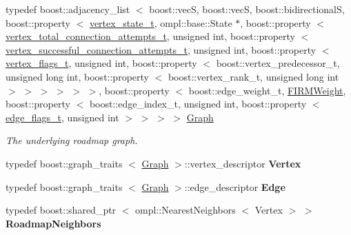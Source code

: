 \begin{DoxyCompactItemize}
\item 
typedef boost\-::adjacency\-\_\-list\*
$<$ boost\-::vec\-S, boost\-::vec\-S, \*
boost\-::bidirectional\-S, \*
boost\-::property\*
$<$ \hyperlink{struct_f_i_r_m_1_1vertex__state__t}{vertex\-\_\-state\-\_\-t}, \*
ompl\-::base\-::\-State \*
$\ast$, boost\-::property\*
$<$ \hyperlink{struct_f_i_r_m_1_1vertex__total__connection__attempts__t}{vertex\-\_\-total\-\_\-connection\-\_\-attempts\-\_\-t}, \*
unsigned int, boost\-::property\*
$<$ \hyperlink{struct_f_i_r_m_1_1vertex__successful__connection__attempts__t}{vertex\-\_\-successful\-\_\-connection\-\_\-attempts\-\_\-t}, \*
unsigned int, boost\-::property\*
$<$ \hyperlink{struct_f_i_r_m_1_1vertex__flags__t}{vertex\-\_\-flags\-\_\-t}, unsigned int, \*
boost\-::property\*
$<$ boost\-::vertex\-\_\-predecessor\-\_\-t, \*
unsigned long int, \*
boost\-::property\*
$<$ boost\-::vertex\-\_\-rank\-\_\-t, \*
unsigned long int $>$\*
 $>$ $>$ $>$ $>$ $>$, boost\-::property\*
$<$ boost\-::edge\-\_\-weight\-\_\-t, \*
\hyperlink{class_f_i_r_m_weight}{\-F\-I\-R\-M\-Weight}, boost\-::property\*
$<$ boost\-::edge\-\_\-index\-\_\-t, \*
unsigned int, boost\-::property\*
$<$ \hyperlink{struct_f_i_r_m_1_1edge__flags__t}{edge\-\_\-flags\-\_\-t}, unsigned int $>$ $>$ $>$ $>$ \hyperlink{class_f_i_r_m_a687e9f4243b22c30ee1fa5da22a85053}{\-Graph}
\begin{DoxyCompactList}\small\item\em \-The underlying roadmap graph. \end{DoxyCompactList}\item 
\hypertarget{class_f_i_r_m_a07eb05796ed64797c900b193aafa9031}{typedef boost\-::graph\-\_\-traits\*
$<$ \hyperlink{class_f_i_r_m_a687e9f4243b22c30ee1fa5da22a85053}{\-Graph} $>$\-::vertex\-\_\-descriptor {\bfseries \-Vertex}}\label{class_f_i_r_m_a07eb05796ed64797c900b193aafa9031}

\item 
\hypertarget{class_f_i_r_m_a88889998bf429572821d467eb44c67c6}{typedef boost\-::graph\-\_\-traits\*
$<$ \hyperlink{class_f_i_r_m_a687e9f4243b22c30ee1fa5da22a85053}{\-Graph} $>$\-::edge\-\_\-descriptor {\bfseries \-Edge}}\label{class_f_i_r_m_a88889998bf429572821d467eb44c67c6}

\item 
\hypertarget{class_f_i_r_m_a687705deb489cff3a2d40b7bec6bdc29}{typedef boost\-::shared\-\_\-ptr\*
$<$ ompl\-::\-Nearest\-Neighbors\*
$<$ \-Vertex $>$ $>$ {\bfseries \-Roadmap\-Neighbors}}\label{class_f_i_r_m_a687705deb489cff3a2d40b7bec6bdc29}


\end{DoxyCompactItemize}
